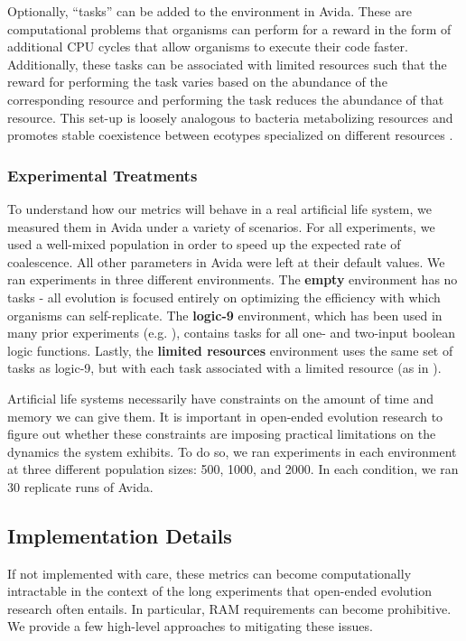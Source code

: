 \documentclass[letterpaper]{article}
\begin{document}
Optionally, ``tasks'' can be added to the environment in Avida. These are computational problems that organisms can perform for a reward in the form of additional CPU cycles that allow organisms to execute their code faster. Additionally, these tasks can be associated with limited resources such that the reward for performing the task varies based on the abundance of the corresponding resource and performing the task reduces the abundance of that resource. This set-up is loosely analogous to bacteria metabolizing resources and promotes stable coexistence between ecotypes specialized on different resources \citep{cooper_evolution_2003}.

\subsubsection{Experimental Treatments}
To understand how our metrics will behave in a real artificial life system, we measured them in Avida under a variety of scenarios. For all experiments, we used a well-mixed population in order to speed up the expected rate of coalescence. All other parameters in Avida were left at their default values. We ran experiments in three different environments. The \textbf{empty} environment has no tasks - all evolution is focused entirely on optimizing the efficiency with which organisms can self-replicate. The \textbf{logic-9} environment, which has been used in many prior experiments (e.g. \citep{lenski_evolutionary_2003}), contains tasks for all one- and two-input boolean logic functions. Lastly, the \textbf{limited resources} environment uses the same set of tasks as logic-9, but with each task associated with a limited resource (as in \citep{cooper_evolution_2003}).

Artificial life systems necessarily have constraints on the amount of time and memory we can give them. It is important in open-ended evolution research to figure out whether these constraints are imposing practical limitations on the dynamics the system exhibits. To do so, we ran experiments in each environment at three different population sizes: 500, 1000, and 2000. In each condition, we ran 30 replicate runs of Avida.

\subsection{Implementation Details}
If not implemented with care, these metrics can become computationally intractable in the context of the long experiments that open-ended evolution research often entails. In particular, RAM requirements can become prohibitive. We provide a few high-level approaches to mitigating these issues.
\end{document}
